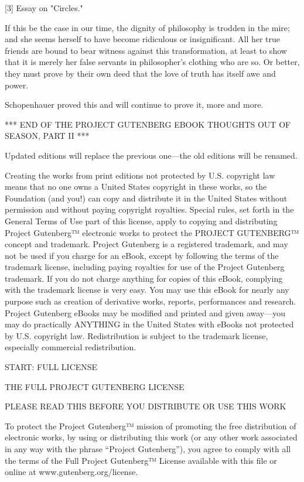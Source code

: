     [3] Essay on "Circles."

If this be the case in our time, the dignity of philosophy is trodden
in the mire; and she seems herself to have become ridiculous or
insignificant. All her true friends are bound to bear witness against
this transformation, at least to show that it is merely her false
servants in philosopher's clothing who are so. Or better, they must
prove by their own deed that the love of truth has itself awe and
power.

Schopenhauer proved this and will continue to prove it, more and
more.









*** END OF THE PROJECT GUTENBERG EBOOK THOUGHTS OUT OF SEASON, PART II ***


    

Updated editions will replace the previous one—the old editions will
be renamed.

Creating the works from print editions not protected by U.S. copyright
law means that no one owns a United States copyright in these works,
so the Foundation (and you!) can copy and distribute it in the United
States without permission and without paying copyright
royalties. Special rules, set forth in the General Terms of Use part
of this license, apply to copying and distributing Project
Gutenberg™ electronic works to protect the PROJECT GUTENBERG™
concept and trademark. Project Gutenberg is a registered trademark,
and may not be used if you charge for an eBook, except by following
the terms of the trademark license, including paying royalties for use
of the Project Gutenberg trademark. If you do not charge anything for
copies of this eBook, complying with the trademark license is very
easy. You may use this eBook for nearly any purpose such as creation
of derivative works, reports, performances and research. Project
Gutenberg eBooks may be modified and printed and given away—you may
do practically ANYTHING in the United States with eBooks not protected
by U.S. copyright law. Redistribution is subject to the trademark
license, especially commercial redistribution.


START: FULL LICENSE

THE FULL PROJECT GUTENBERG LICENSE

PLEASE READ THIS BEFORE YOU DISTRIBUTE OR USE THIS WORK

To protect the Project Gutenberg™ mission of promoting the free
distribution of electronic works, by using or distributing this work
(or any other work associated in any way with the phrase “Project
Gutenberg”), you agree to comply with all the terms of the Full
Project Gutenberg™ License available with this file or online at
www.gutenberg.org/license.

